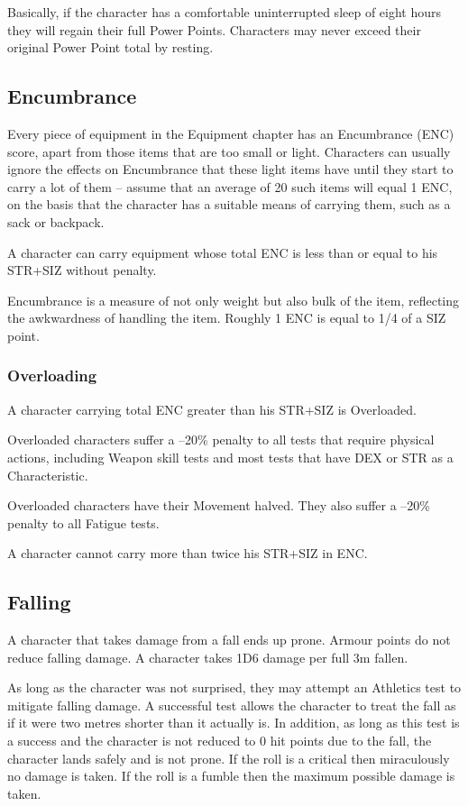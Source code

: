 Basically, if the character has a comfortable uninterrupted sleep of eight hours they will regain their full Power Points. Characters may never exceed their original Power Point total by resting.


\subsection{Encumbrance}
\label{ssec:encumbrance}
Every piece of equipment in the Equipment chapter has an Encumbrance (ENC) score, apart from those items that are too small or light. Characters can usually ignore the effects on Encumbrance that these light items have until they start to carry a lot of them – assume that an average of 20 such items will equal 1 ENC, on the basis that the character has a suitable means of carrying them, such as a sack or backpack. 

A character can carry equipment whose total ENC is less than or equal to his STR+SIZ without penalty. 

Encumbrance is a measure of not only weight but also bulk of the item, reflecting the awkwardness of handling the item. Roughly 1 ENC is equal to 1/4 of a SIZ point.

\subsubsection{Overloading}
A character carrying total ENC greater than his STR+SIZ is Overloaded. 
\begin{rpg-list}
\item Overloaded characters suffer a –20\% penalty to all tests that require physical actions, including Weapon skill tests and most tests that have DEX or STR as a Characteristic. 

\item Overloaded characters have their Movement halved. They also suffer a –20\% penalty to all Fatigue tests. 
\end{rpg-list}

A character cannot carry more than twice his STR+SIZ in ENC. 

\subsection{Falling}
A character that takes damage from a fall ends up prone. Armour points do not reduce falling damage. 
A character takes 1D6 damage per full 3m fallen.

As long as the character was not surprised, they may attempt an Athletics test to mitigate falling damage. A successful test allows the character to treat the fall as if it were two metres shorter than it actually is. In addition, as long as this test is a success and the character is not reduced to 0 hit points due to the fall, the character lands safely and is not prone. If the roll is a critical then miraculously no damage is taken. If the roll is a fumble then the maximum possible damage is taken.

